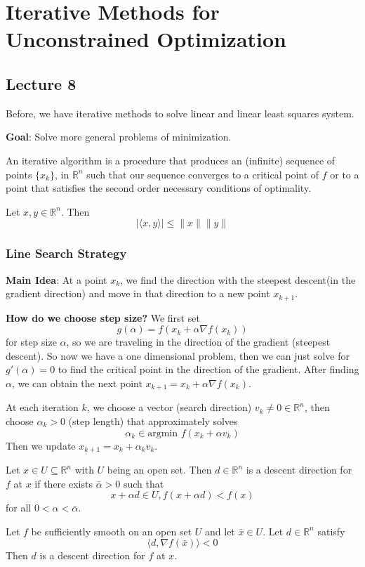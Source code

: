 \section{Iterative Methods for Unconstrained Optimization}
\subsection{Lecture 8}
Before, we have iterative methods to solve linear and linear least squares system.

\textbf{Goal}: Solve more general problems of minimization.

An iterative algorithm is a procedure that produces an (infinite) sequence of points $\{x_k\}$, in $\mathbb R^n$ such that our sequence converges to a critical point of $f$ or to a point that satisfies the second order necessary conditions of optimality.
\begin{theorem}
  Let $x, y \in \mathbb R^n$. Then $$|\langle x, y \rangle| \leq \|x\| \|y\|$$
\end{theorem}

\subsubsection*{Line Search Strategy}
\textbf{Main Idea}: At a point $x_k$, we find the direction with the steepest descent(in the gradient direction) and move in that direction to a new point $x_{k+1}$.

\textbf{How do we choose step size?} We first set $$g(\alpha) = f(x_k + \alpha \nabla f(x_k))$$ for step size $\alpha$, so we are traveling in the direction of the gradient (steepest descent). So now we have a one dimensional problem, then we can just solve for $g'(\alpha) = 0$ to find the critical point in the direction of the gradient. After finding $\alpha$, we can obtain the next point $x_{k+1} = x_k + \alpha \nabla f(x_k)$.

\begin{definition}
  At each iteration $k$, we choose a vector (search direction) $v_k \neq 0 \in \mathbb R^n$, then choose $\alpha_k > 0$ (step length) that approximately solves
$$\alpha_k \in \text{argmin } f(x_k + \alpha v_k)$$
Then we update $x_{k+1} = x_k + \alpha_k v_k$.
\end{definition}
\begin{definition}
  Let $x \in U \subseteq \mathbb R^n$ with $U$ being an open set. Then $d \in \mathbb R^n$ is a descent direction for $f$ at $x$ if there exists $\bar \alpha > 0$ such that $$x + \alpha d \in U, f(x + \alpha d) < f(x)$$ for all $0 < \alpha < \bar \alpha$.
\end{definition}
\begin{lemma}
  Let $f$ be sufficiently smooth on an open set $U$ and let $\bar x \in U$. Let $d \in \mathbb R^n$ satisfy $$\langle d, \nabla f(\bar x) \rangle < 0$$ Then $d$ is a descent direction for $f$ at $x$.
\end{lemma}
